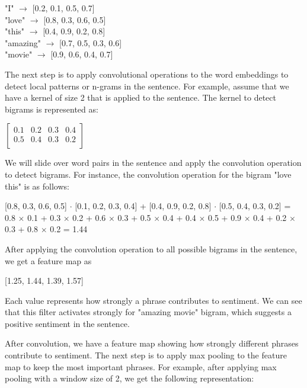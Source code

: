 \documentclass[10pt]{article}
\begin{document}
\begin{description}
\begin{center}
    "I" $\rightarrow$ [0.2, 0.1, 0.5, 0.7] \\
    "love" $\rightarrow$ [0.8, 0.3, 0.6, 0.5] \\
    "this" $\rightarrow$ [0.4, 0.9, 0.2, 0.8] \\
    "amazing" $\rightarrow$ [0.7, 0.5, 0.3, 0.6] \\
    "movie" $\rightarrow$ [0.9, 0.6, 0.4, 0.7] \\
\end{center}

The next step is to apply convolutional operations to the word embeddings to detect
local patterns or n-grams in the sentence. For example, assume that we have a kernel of size 2 that is applied to the sentence.
The kernel to detect bigrams is represented as:

\begin{center}
    $\displaystyle{\begin{bmatrix} 0.1 & 0.2 & 0.3 & 0.4 \\  0.5 & 0.4 & 0.3 & 0.2 \\ \end{bmatrix}}$
\end{center}

We will slide over word pairs in the sentence and apply the convolution operation to detect bigrams.
For instance, the convolution operation for the bigram "love this" is as follows:

\begin{center}
    [0.8, 0.3, 0.6, 0.5] $\cdot$ [0.1, 0.2, 0.3, 0.4] + [0.4, 0.9, 0.2, 0.8] $\cdot$ [0.5, 0.4, 0.3, 0.2] = 0.8 $\times$ 0.1 + 0.3 $\times$ 0.2 + 0.6 $\times$ 0.3 + 0.5 $\times$ 0.4 + 0.4 $\times$ 0.5 + 0.9 $\times$ 0.4 + 0.2 $\times$ 0.3 + 0.8 $\times$ 0.2 = 1.44
\end{center}

After applying the convolution operation to all possible bigrams in the sentence, we get a feature map as 

\begin{center}
    [1.25, 1.44, 1.39, 1.57]
\end{center}

Each value represents how strongly a phrase contributes to sentiment.
We can see that this filter activates strongly for "amazing movie" bigram, which suggests a positive sentiment in the sentence.

After convolution, we have a feature map showing how strongly different phrases contribute to sentiment.
The next step is to apply max pooling to the feature map to keep the most important phrases.
For example, after applying max pooling with a window size of 2, we get the following representation:


\end{description}
\end{document}
